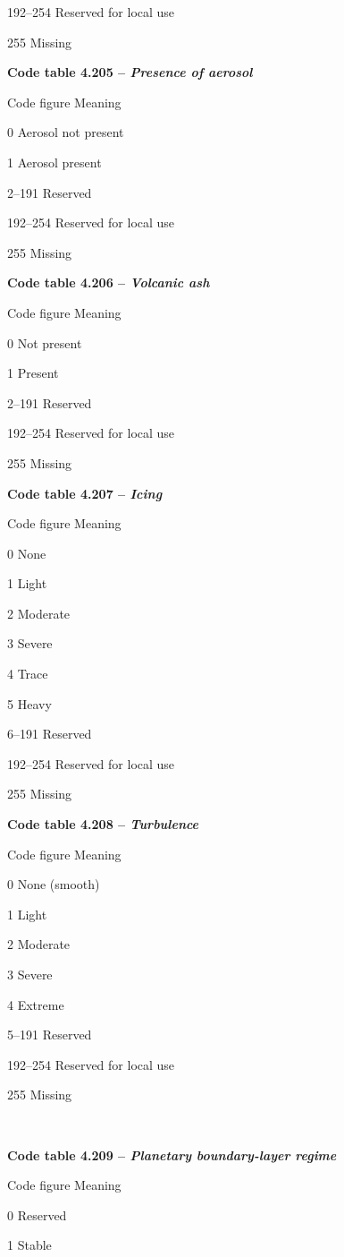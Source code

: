 192--254 Reserved for local use

255 Missing

\textbf{Code table 4.205 -- \emph{Presence of aerosol}}

Code figure Meaning

0 Aerosol not present

1 Aerosol present

2--191 Reserved

192--254 Reserved for local use

255 Missing

\textbf{Code table 4.206 -- \emph{Volcanic ash}}

Code figure Meaning

0 Not present

1 Present

2--191 Reserved

192--254 Reserved for local use

255 Missing

\textbf{Code table 4.207 -- \emph{Icing}}

Code figure Meaning

0 None

1 Light

2 Moderate

3 Severe

4 Trace

5 Heavy

6--191 Reserved

192--254 Reserved for local use

255 Missing

\textbf{Code table 4.208 -- \emph{Turbulence}}

Code figure Meaning

0 None (smooth)

1 Light

2 Moderate

3 Severe

4 Extreme

5--191 Reserved

192--254 Reserved for local use

255 Missing

\textbf{\\
}

\textbf{Code table 4.209 -- \emph{Planetary boundary-layer regime}}

Code figure Meaning

0 Reserved

1 Stable

